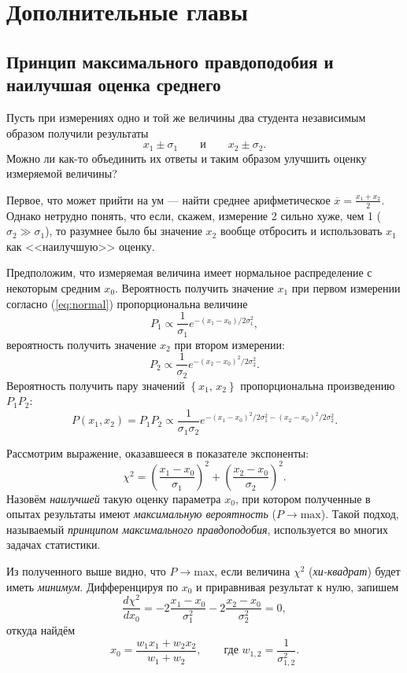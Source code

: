 \chapter{Дополнительные главы}

\small

\section{Принцип максимального правдоподобия и наилучшая оценка среднего}

Пусть при измерениях одно и той же величины два студента
независимым образом получили результаты 
\[
x_{1}\pm\sigma_{1}\qquad\text{и}\qquad x_{2}\pm\sigma_{2}.
\]
Можно ли как-то объединить их ответы и таким образом улучшить оценку
измеряемой величины?

Первое, что может прийти на ум --- найти среднее
арифметическое $\overline{x}=\frac{x_{1}+x_{2}}{2}.$ Однако нетрудно
понять, что если, скажем, измерение 2 сильно хуже, чем 1 ($\sigma_{2}\gg\sigma_{1}$),
то разумнее было бы значение $x_{2}$ вообще отбросить и использовать
$x_{1}$ как <<наилучшую>> оценку.

Предположим, что измеряемая величина имеет нормальное распределение
с некоторым средним $x_{0}$. Вероятность получить значение $x_{1}$
при первом измерении согласно (\ref{eq:normal}) пропорциональна величине
\[
P_{1}\propto\frac{1}{\sigma_{1}}e^{-\left(x_{1}-x_{0}\right)/2\sigma_{1}^{2}},
\]
вероятность получить значение $x_{2}$ при втором измерении:
\[
P_{2}\propto\frac{1}{\sigma_{2}}e^{-\left(x_{2}-x_{0}\right)^{2}/2\sigma_{2}^{2}}.
\]
Вероятность получить пару значений $\left\{ x_{1},\,x_{2}\right\} $
пропорциональна произведению $P_{1}P_{2}$:
\[
P\left(x_{1},x_{2}\right)=P_{1}P_{2}\propto\frac{1}{\sigma_{1}\sigma_{2}}e^{-\left(x_{1}-x_{0}\right)^{2}/2\sigma_{1}^{2}-\left(x_{2}-x_{0}\right)^{2}/2\sigma_{2}^{2}}.
\]

Рассмотрим выражение, оказавшееся в показателе экспоненты:
\[
\chi^{2}=\left(\frac{x_{1}-x_{0}}{\sigma_{1}}\right)^{2}+\left(\frac{x_{2}-x_{0}}{\sigma_{2}}\right)^{2}.
\]
Назовём \emph{наилучшей} такую оценку параметра
$x_{0}$, при котором полученные в опытах результаты имеют \emph{максимальную
вероятность} ($P\to\mathrm{max}$). Такой подход, называемый
\emph{принципом максимального правдоподобия}, используется
во многих задачах статистики.

Из полученного выше видно, что $P\to\mathrm{max}$, если
величина $\chi^{2}$ (\emph{хи-квадрат}) будет иметь
\emph{минимум}. Дифференцируя по $x_{0}$ и приравнивая
результат к нулю, запишем 
\[
\frac{d\chi^{2}}{dx_{0}}=-2\frac{x_{1}-x_{0}}{\sigma_{1}^{2}}-2\frac{x_{2}-x_{0}}{\sigma_{2}^{2}}=0,
\]
откуда найдём
\begin{equation}
x_{0}=\frac{w_{1}x_{1}+w_{2}x_{2}}{w_{1}+w_{2}},\qquad\text{где }w_{1,2}=\frac{1}{\sigma_{1,2}^{2}}.
\end{equation}

